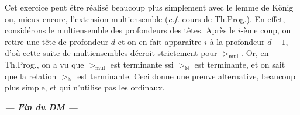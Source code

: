 \documentclass{../notes}
\begin{document}
  \begin{slshape}
    Cet exercice peut être réalisé beaucoup plus simplement avec le lemme de König ou, mieux encore, l'extension multiensemble (\textit{c.f.} cours de Th.Prog.).
    En effet, considérons le multiensemble des profondeurs des têtes.
    Après le $i$-ème coup, on retire une tête de profondeur $d$ et on en fait apparaître $i$ à la profondeur $d - 1$, d'où cette suite de multiensembles décroit strictement pour $>_\mathrm{mul}$.
    Or, en Th.Prog., on a vu que $>_\mathrm{mul}$ est terminante ssi $>_\mathds{N}$ est terminante, et on sait que la relation $>_\mathds{N}$ est terminante.
    Ceci donne une preuve alternative, beaucoup plus simple, et qui n'utilise pas les ordinaux.
  \end{slshape}


  \vfill

  \begin{center}
    \color{deepblue}
    \bfseries
    \itshape
    --- Fin du DM ---
  \end{center}

  \vfill
\end{document}

